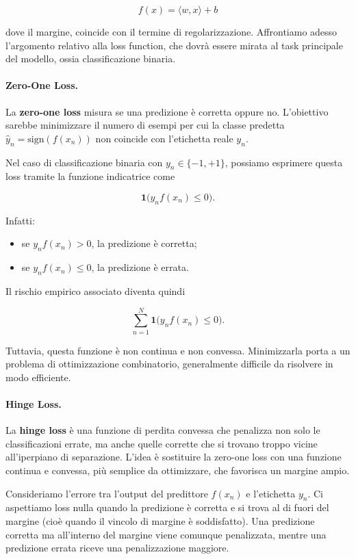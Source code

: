 $$f(x) = \langle w, x \rangle + b$$

dove il margine, coincide con il termine di regolarizzazione. Affrontiamo adesso l'argomento relativo alla loss function, che dovrà essere mirata al task principale del modello, ossia classificazione binaria. 

\paragraph{Zero-One Loss.}

La \textbf{zero-one loss} misura se una predizione è corretta oppure no.
L'obiettivo sarebbe minimizzare il numero di esempi per cui la classe
predetta $\hat{y}_n = \mathrm{sign}(f(x_n))$ non coincide con
l'etichetta reale $y_n$.

Nel caso di classificazione binaria con $y_n \in \{-1,+1\}$,
possiamo esprimere questa loss tramite la funzione indicatrice come

\[
\mathbf{1}\big(y_n f(x_n) \le 0\big).
\]

Infatti:
\begin{itemize}
    \item se $y_n f(x_n) > 0$, la predizione è corretta;
    \item se $y_n f(x_n) \le 0$, la predizione è errata.
\end{itemize}

Il rischio empirico associato diventa quindi

\[
\sum_{n=1}^{N}
\mathbf{1}\big(y_n f(x_n) \le 0\big).
\]

Tuttavia, questa funzione è non continua e non convessa.
Minimizzarla porta a un problema di ottimizzazione combinatorio,
generalmente difficile da risolvere in modo efficiente.

\paragraph{Hinge Loss.}

La \textbf{hinge loss} è una funzione di perdita convessa che penalizza non solo le classificazioni errate, ma anche quelle corrette che si trovano troppo vicine all'iperpiano di separazione. L'idea è sostituire la zero-one loss con una funzione continua e convessa, più semplice da ottimizzare, che favorisca un margine ampio.

Consideriamo l'errore tra l'output del predittore $f(x_n)$ e l'etichetta $y_n$. Ci aspettiamo loss nulla quando la predizione è corretta e si trova al di fuori del margine (cioè quando il vincolo di margine è soddisfatto). Una predizione corretta ma all'interno del margine viene comunque penalizzata, mentre una predizione errata riceve una penalizzazione maggiore.

